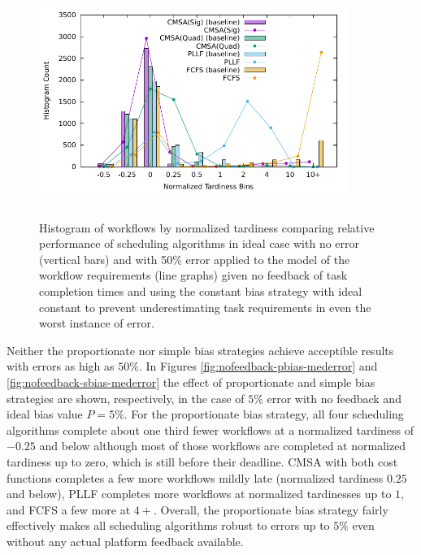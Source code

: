 \documentclass[10pt]{csce}
\begin{document}
\begin{figure}
	\begin{center}
		\includegraphics[width=0.9\textwidth,height=3in]{figures/Histogram_All_CompleteHighAllUniformError_WithCBias.pdf}
	\end{center}
	\caption{Histogram of workflows by normalized tardiness comparing
		relative performance of scheduling algorithms in ideal case with no
		error (vertical bars) and with 50\% error applied to the model of the
		workflow requirements (line graphs) given no feedback of task
		completion times and using the constant bias strategy with ideal
		constant to prevent underestimating task requirements in even the
		worst instance of error.}
	\label{fig:nofeedback-cbias-higherror}
\end{figure}

Neither the proportionate nor simple bias strategies achieve acceptible
results with errors as high as $50\%$.  In Figures
\ref{fig:nofeedback-pbias-mederror} and \ref{fig:nofeedback-sbias-mederror}
the effect of proportionate and simple bias strategies are shown, respectively,
in the case of $5\%$ error with no feedback and ideal bias value $P=5\%$.
For the proportionate bias strategy, all four scheduling algorithms complete
about one third fewer workflows at a normalized tardiness of $-0.25$ and below
although most of those workflows are completed at normalized tardiness up to
zero, which is still before their deadline.  CMSA with both cost functions completes
a few more workflows mildly late (normalized tardiness $0.25$ and below), PLLF
completes more workflows at normalized tardinesses up to $1$, and FCFS a few
more at $4+$.  Overall, the proportionate bias strategy fairly effectively
makes all scheduling algorithms robust to errors up to $5\%$ even without any
actual platform feedback available.
\end{document}
